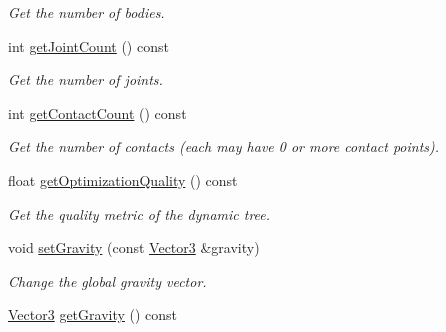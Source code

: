 \begin{DoxyCompactItemize}
\begin{DoxyCompactList}\small\item\em Get the number of bodies. \end{DoxyCompactList}\item 
int \hyperlink{class_i_dream_sky_1_1_physics3_1_1_world_ab183a5a62cc075c51622766d1f085dcb}{get\+Joint\+Count} () const \hypertarget{class_i_dream_sky_1_1_physics3_1_1_world_ab183a5a62cc075c51622766d1f085dcb}{}\label{class_i_dream_sky_1_1_physics3_1_1_world_ab183a5a62cc075c51622766d1f085dcb}

\begin{DoxyCompactList}\small\item\em Get the number of joints. \end{DoxyCompactList}\item 
int \hyperlink{class_i_dream_sky_1_1_physics3_1_1_world_aa642556a72c8d30bd192319d459b1d22}{get\+Contact\+Count} () const \hypertarget{class_i_dream_sky_1_1_physics3_1_1_world_aa642556a72c8d30bd192319d459b1d22}{}\label{class_i_dream_sky_1_1_physics3_1_1_world_aa642556a72c8d30bd192319d459b1d22}

\begin{DoxyCompactList}\small\item\em Get the number of contacts (each may have 0 or more contact points). \end{DoxyCompactList}\item 
float \hyperlink{class_i_dream_sky_1_1_physics3_1_1_world_a7995a59ae4b7a17b5b573660d8d11879}{get\+Optimization\+Quality} () const 
\begin{DoxyCompactList}\small\item\em Get the quality metric of the dynamic tree. \end{DoxyCompactList}\item 
void \hyperlink{class_i_dream_sky_1_1_physics3_1_1_world_a3f92c8c4f591a9055843aef1b26c2166}{set\+Gravity} (const \hyperlink{class_i_dream_sky_1_1_vector3}{Vector3} \&gravity)\hypertarget{class_i_dream_sky_1_1_physics3_1_1_world_a3f92c8c4f591a9055843aef1b26c2166}{}\label{class_i_dream_sky_1_1_physics3_1_1_world_a3f92c8c4f591a9055843aef1b26c2166}

\begin{DoxyCompactList}\small\item\em Change the global gravity vector. \end{DoxyCompactList}\item 
\hyperlink{class_i_dream_sky_1_1_vector3}{Vector3} \hyperlink{class_i_dream_sky_1_1_physics3_1_1_world_a44a290816f4a4faba9667327ff7b0726}{get\+Gravity} () const \hypertarget{class_i_dream_sky_1_1_physics3_1_1_world_a44a290816f4a4faba9667327ff7b0726}{}\label{class_i_dream_sky_1_1_physics3_1_1_world_a44a290816f4a4faba9667327ff7b0726}


\end{DoxyCompactItemize}
